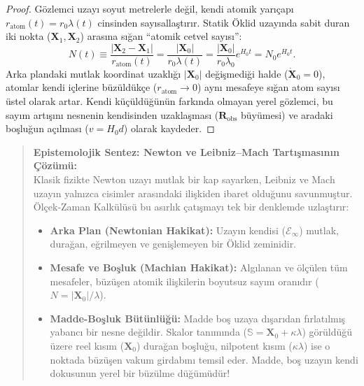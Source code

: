 \documentclass[11pt,a4paper]{article}
\begin{document}
\begin{proof}
    Gözlemci uzayı soyut metrelerle değil, kendi atomik yarıçapı $r_{\mathrm{atom}}(t) = r_0 \lambda(t)$ cinsinden sayısallaştırır. Statik Öklid uzayında sabit duran iki nokta ($\mathbf{X}_1, \mathbf{X}_2$) arasına sığan ``atomik cetvel sayısı'':
    \begin{equation}
        N(t) \equiv \frac{|\mathbf{X}_2 - \mathbf{X}_1|}{r_{\mathrm{atom}}(t)} = \frac{|\mathbf{X}_0|}{r_0 \lambda(t)} = \frac{|\mathbf{X}_0|}{r_0 \lambda_0} e^{H_0 t} = N_0 e^{H_0 t}.
        \label{eq:cetvel_sayimi_ispat_sc}
    \end{equation}
    Arka plandaki mutlak koordinat uzaklığı $|\mathbf{X}_0|$ değişmediği halde ($\dot{\mathbf{X}}_0 = 0$), atomlar kendi içlerine büzüldükçe ($r_{\mathrm{atom}} \to 0$) aynı mesafeye sığan atom sayısı üstel olarak artar. Kendi küçüldüğünün farkında olmayan yerel gözlemci, bu sayım artışını nesnenin kendisinden uzaklaşması ($\mathbf{R}_{\mathrm{obs}}$ büyümesi) ve aradaki boşluğun açılması ($v = H_0 d$) olarak kaydeder.
\end{proof}

\begin{quote}
    \small
    \textbf{Epistemolojik Sentez: Newton ve Leibniz--Mach Tartışmasının Çözümü:} \\
    Klasik fizikte Newton uzayı mutlak bir kap sayarken, Leibniz ve Mach uzayın yalnızca cisimler arasındaki ilişkiden ibaret olduğunu savunmuştur. Ölçek-Zaman Kalkülüsü bu asırlık çatışmayı tek bir denklemde uzlaştırır:
    \begin{itemize}
        \item \textbf{Arka Plan (Newtonian Hakikat):} Uzayın kendisi ($\mathcal{E}_\infty$) mutlak, durağan, eğrilmeyen ve genişlemeyen bir Öklid zeminidir.
        \item \textbf{Mesafe ve Boşluk (Machian Hakikat):} Algılanan ve ölçülen tüm mesafeler, büzüşen atomik ilişkilerin boyutsuz sayım oranıdır ($N = |\mathbf{X}_0|/\lambda$).
        \item \textbf{Madde-Boşluk Bütünlüğü:} Madde boş uzaya dışarıdan fırlatılmış yabancı bir nesne değildir. Skalor tanımında ($\mathbb{S} = \mathbf{X}_0 + \kappa \lambda$) görüldüğü üzere reel kısım ($\mathbf{X}_0$) durağan boşluğu, nilpotent kısım ($\kappa \lambda$) ise o noktada büzüşen vakum girdabını temsil eder. Madde, boş uzayın kendi dokusunun yerel bir büzülme düğümüdür!
    \end{itemize}
\end{quote}
\end{document}
